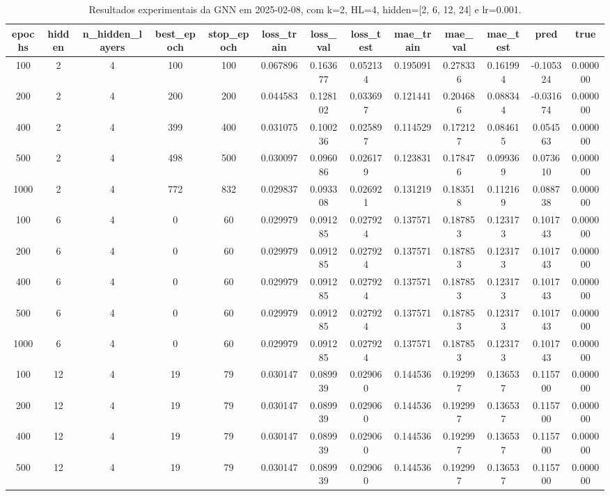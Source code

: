 \begin{table}[h]
\centering
\caption{Resultados experimentais da GNN em 2025-02-08, com k=2, HL=4, hidden=[2, 6, 12, 24] e lr=0.001.}
\label{tab:gnn_results_k2_hl4_d20250208}
\begin{tabular}{ccccccccccccc}
\toprule
epochs & hidden & n\_hidden\_layers & best\_epoch & stop\_epoch & loss\_train & loss\_val & loss\_test & mae\_train & mae\_val & mae\_test & pred & true \\
\midrule
100 & 2 & 4 & 100 & 100 & 0.067896 & 0.163677 & 0.052134 & 0.195091 & 0.278336 & 0.161994 & -0.105324 & 0.000000 \\
200 & 2 & 4 & 200 & 200 & 0.044583 & 0.128102 & 0.033697 & 0.121441 & 0.204686 & 0.088344 & -0.031674 & 0.000000 \\
400 & 2 & 4 & 399 & 400 & 0.031075 & 0.100236 & 0.025897 & 0.114529 & 0.172127 & 0.084615 & 0.054563 & 0.000000 \\
500 & 2 & 4 & 498 & 500 & 0.030097 & 0.096086 & 0.026179 & 0.123831 & 0.178476 & 0.099369 & 0.073610 & 0.000000 \\
1000 & 2 & 4 & 772 & 832 & 0.029837 & 0.093308 & 0.026921 & 0.131219 & 0.183518 & 0.112169 & 0.088738 & 0.000000 \\
100 & 6 & 4 & 0 & 60 & 0.029979 & 0.091285 & 0.027924 & 0.137571 & 0.187853 & 0.123173 & 0.101743 & 0.000000 \\
200 & 6 & 4 & 0 & 60 & 0.029979 & 0.091285 & 0.027924 & 0.137571 & 0.187853 & 0.123173 & 0.101743 & 0.000000 \\
400 & 6 & 4 & 0 & 60 & 0.029979 & 0.091285 & 0.027924 & 0.137571 & 0.187853 & 0.123173 & 0.101743 & 0.000000 \\
500 & 6 & 4 & 0 & 60 & 0.029979 & 0.091285 & 0.027924 & 0.137571 & 0.187853 & 0.123173 & 0.101743 & 0.000000 \\
1000 & 6 & 4 & 0 & 60 & 0.029979 & 0.091285 & 0.027924 & 0.137571 & 0.187853 & 0.123173 & 0.101743 & 0.000000 \\
100 & 12 & 4 & 19 & 79 & 0.030147 & 0.089939 & 0.029060 & 0.144536 & 0.192997 & 0.136537 & 0.115700 & 0.000000 \\
200 & 12 & 4 & 19 & 79 & 0.030147 & 0.089939 & 0.029060 & 0.144536 & 0.192997 & 0.136537 & 0.115700 & 0.000000 \\
400 & 12 & 4 & 19 & 79 & 0.030147 & 0.089939 & 0.029060 & 0.144536 & 0.192997 & 0.136537 & 0.115700 & 0.000000 \\
500 & 12 & 4 & 19 & 79 & 0.030147 & 0.089939 & 0.029060 & 0.144536 & 0.192997 & 0.136537 & 0.115700 & 0.000000 \\

\end{tabular}
\end{table}
